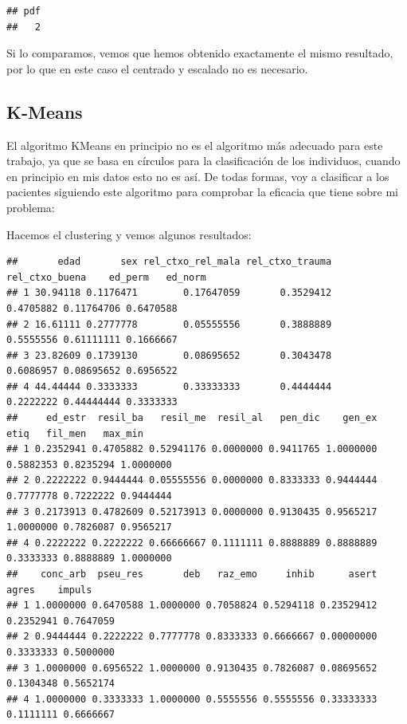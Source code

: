 \documentclass[]{article}
\newenvironment{Shaded}{\begin{snugshade}}{\end{snugshade}}
\newcommand{\KeywordTok}[1]{\textcolor[rgb]{0.13,0.29,0.53}{\textbf{#1}}}
\newcommand{\DataTypeTok}[1]{\textcolor[rgb]{0.13,0.29,0.53}{#1}}
\newcommand{\DecValTok}[1]{\textcolor[rgb]{0.00,0.00,0.81}{#1}}
\newcommand{\StringTok}[1]{\textcolor[rgb]{0.31,0.60,0.02}{#1}}
\newcommand{\CommentTok}[1]{\textcolor[rgb]{0.56,0.35,0.01}{\textit{#1}}}
\newcommand{\OperatorTok}[1]{\textcolor[rgb]{0.81,0.36,0.00}{\textbf{#1}}}
\newcommand{\NormalTok}[1]{#1}
\begin{document}
\begin{verbatim}
## pdf 
##   2
\end{verbatim}

Si lo comparamos, vemos que hemos obtenido exactamente el mismo
resultado, por lo que en este caso el centrado y escalado no es
necesario.

\subsection{K-Means}\label{k-means}

El algoritmo KMeans en principio no es el algoritmo más adecuado para
este trabajo, ya que se basa en círculos para la clasificación de los
individuos, cuando en principio en mis datos esto no es así. De todas
formas, voy a clasificar a los pacientes siguiendo este algoritmo para
comprobar la eficacia que tiene sobre mi problema:

Hacemos el clustering y vemos algunos resultados:

\begin{Shaded}
\end{Shaded}

\begin{verbatim}
##       edad       sex rel_ctxo_rel_mala rel_ctxo_trauma rel_ctxo_buena    ed_perm   ed_norm
## 1 30.94118 0.1176471        0.17647059       0.3529412      0.4705882 0.11764706 0.6470588
## 2 16.61111 0.2777778        0.05555556       0.3888889      0.5555556 0.61111111 0.1666667
## 3 23.82609 0.1739130        0.08695652       0.3043478      0.6086957 0.08695652 0.6956522
## 4 44.44444 0.3333333        0.33333333       0.4444444      0.2222222 0.44444444 0.3333333
##     ed_estr  resil_ba   resil_me  resil_al   pen_dic    gen_ex      etiq   fil_men   max_min
## 1 0.2352941 0.4705882 0.52941176 0.0000000 0.9411765 1.0000000 0.5882353 0.8235294 1.0000000
## 2 0.2222222 0.9444444 0.05555556 0.0000000 0.8333333 0.9444444 0.7777778 0.7222222 0.9444444
## 3 0.2173913 0.4782609 0.52173913 0.0000000 0.9130435 0.9565217 1.0000000 0.7826087 0.9565217
## 4 0.2222222 0.2222222 0.66666667 0.1111111 0.8888889 0.8888889 0.3333333 0.8888889 1.0000000
##    conc_arb  pseu_res       deb   raz_emo     inhib      asert     agres    impuls
## 1 1.0000000 0.6470588 1.0000000 0.7058824 0.5294118 0.23529412 0.2352941 0.7647059
## 2 0.9444444 0.2222222 0.7777778 0.8333333 0.6666667 0.00000000 0.3333333 0.5000000
## 3 1.0000000 0.6956522 1.0000000 0.9130435 0.7826087 0.08695652 0.1304348 0.5652174
## 4 1.0000000 0.3333333 1.0000000 0.5555556 0.5555556 0.33333333 0.1111111 0.6666667
\end{verbatim}
\end{document}
